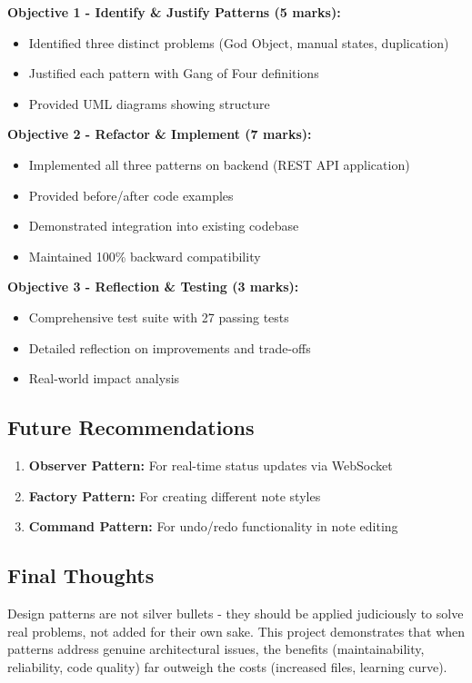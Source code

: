 \documentclass[11pt,a4paper]{article}
\begin{document}
\textbf{Objective 1 - Identify \& Justify Patterns (5 marks):}
\begin{itemize}
    \item Identified three distinct problems (God Object, manual states, duplication)
    \item Justified each pattern with Gang of Four definitions
    \item Provided UML diagrams showing structure
\end{itemize}

\textbf{Objective 2 - Refactor \& Implement (7 marks):}
\begin{itemize}
    \item Implemented all three patterns on backend (REST API application)
    \item Provided before/after code examples
    \item Demonstrated integration into existing codebase
    \item Maintained 100\% backward compatibility
\end{itemize}

\textbf{Objective 3 - Reflection \& Testing (3 marks):}
\begin{itemize}
    \item Comprehensive test suite with 27 passing tests
    \item Detailed reflection on improvements and trade-offs
    \item Real-world impact analysis
\end{itemize}

\subsection{Future Recommendations}

\begin{enumerate}
    \item \textbf{Observer Pattern:} For real-time status updates via WebSocket
    \item \textbf{Factory Pattern:} For creating different note styles
    \item \textbf{Command Pattern:} For undo/redo functionality in note editing
\end{enumerate}

\subsection{Final Thoughts}

Design patterns are not silver bullets - they should be applied judiciously to solve real problems, not added for their own sake. This project demonstrates that when patterns address genuine architectural issues, the benefits (maintainability, reliability, code quality) far outweigh the costs (increased files, learning curve).
\end{document}
